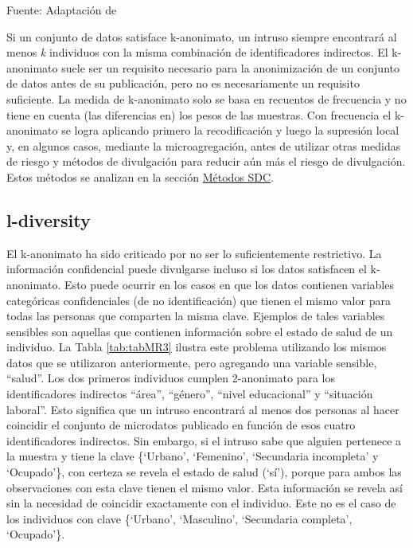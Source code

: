 \documentclass[
]{book}
\theoremstyle{definition}
\theoremstyle{definition}
\theoremstyle{definition}
\theoremstyle{definition}
\theoremstyle{remark}
\begin{document}
Fuente: Adaptación de \citep[p.32]{benschop}

Si un conjunto de datos satisface k-anonimato, un intruso siempre encontrará al menos \emph{k} individuos con la misma combinación de identificadores indirectos. El k-anonimato suele ser un requisito necesario para la anonimización de un conjunto de datos antes de su publicación, pero no es necesariamente un requisito suficiente. La medida de k-anonimato solo se basa en recuentos de frecuencia y no tiene en cuenta (las diferencias en) los pesos de las muestras. Con frecuencia el k-anonimato se logra aplicando primero la recodificación y luego la supresión local y, en algunos casos, mediante la microagregación, antes de utilizar otras medidas de riesgo y métodos de divulgación para reducir aún más el riesgo de divulgación. Estos métodos se analizan en la sección \protect\hyperlink{muxe9todos-sdc}{Métodos SDC}.

\hypertarget{l-diversity}{%
\subsection{l-diversity}\label{l-diversity}}

El k-anonimato ha sido criticado por no ser lo suficientemente restrictivo. La información confidencial puede divulgarse incluso si los datos satisfacen el k-anonimato. Esto puede ocurrir en los casos en que los datos contienen variables categóricas confidenciales (de no identificación) que tienen el mismo valor para todas las personas que comparten la misma clave. Ejemplos de tales variables sensibles son aquellas que contienen información sobre el estado de salud de un individuo. La Tabla \ref{tab:tabMR3} ilustra este problema utilizando los mismos datos que se utilizaron anteriormente, pero agregando una variable sensible, ``salud''. Los dos primeros individuos cumplen 2-anonimato para los identificadores indirectos ``área'', ``género'', ``nivel educacional'' y ``situación laboral''. Esto significa que un intruso encontrará al menos dos personas al hacer coincidir el conjunto de microdatos publicado en función de esos cuatro identificadores indirectos. Sin embargo, si el intruso sabe que alguien pertenece a la muestra y tiene la clave \{`Urbano', `Femenino', `Secundaria incompleta' y `Ocupado'\}, con certeza se revela el estado de salud (`sí'), porque para ambos las observaciones con esta clave tienen el mismo valor. Esta información se revela así sin la necesidad de coincidir exactamente con el individuo. Este no es el caso de los individuos con clave \{`Urbano', `Masculino', `Secundaria completa', `Ocupado'\}.
\end{document}
